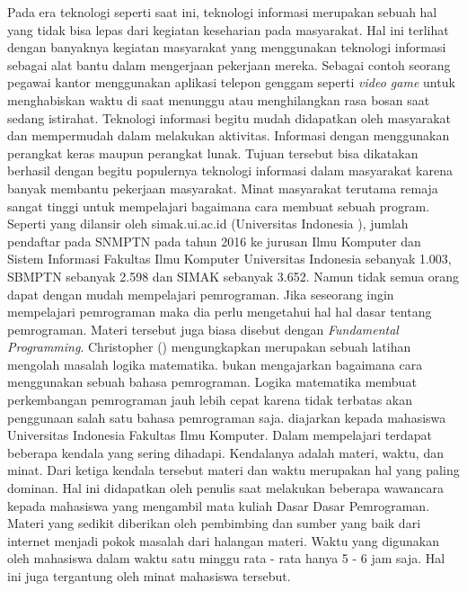 Pada era teknologi seperti saat ini, teknologi informasi merupakan sebuah hal yang tidak bisa lepas dari kegiatan keseharian pada masyarakat. Hal ini terlihat dengan banyaknya kegiatan masyarakat yang menggunakan teknologi informasi sebagai alat bantu dalam mengerjaan pekerjaan mereka. Sebagai contoh seorang pegawai kantor menggunakan aplikasi telepon genggam seperti \textit{video game} untuk menghabiskan waktu di saat menunggu atau menghilangkan rasa bosan saat sedang istirahat.
\linebreak
\linebreak
Teknologi informasi begitu mudah didapatkan oleh masyarakat dan mempermudah dalam melakukan aktivitas. Informasi dengan menggunakan perangkat keras maupun perangkat lunak. Tujuan tersebut bisa dikatakan berhasil dengan begitu populernya teknologi informasi dalam masyarakat karena banyak membantu pekerjaan masyarakat.
\linebreak\linebreak
Minat masyarakat terutama remaja sangat tinggi untuk mempelajari bagaimana cara membuat sebuah program. Seperti yang dilansir oleh simak.ui.ac.id (Universitas Indonesia \citeyear{article.simak}), jumlah pendaftar pada SNMPTN pada tahun 2016 ke jurusan Ilmu Komputer dan Sistem Informasi Fakultas Ilmu Komputer Universitas Indonesia sebanyak 1.003, SBMPTN sebanyak 2.598 dan SIMAK sebanyak 3.652. Namun tidak semua orang dapat dengan mudah mempelajari pemrograman. Jika seseorang ingin mempelajari pemrograman maka dia perlu mengetahui hal hal dasar tentang pemrograman. Materi tersebut juga biasa disebut dengan \textit{Fundamental Programming}.
\linebreak\linebreak
Christopher (\citeyear{paper.christoper}) mengungkapkan \ddp merupakan sebuah latihan mengolah masalah logika matematika. \DDP bukan mengajarkan bagaimana cara menggunakan sebuah bahasa pemrograman. Logika matematika membuat perkembangan pemrograman jauh lebih cepat karena tidak terbatas akan penggunaan salah satu bahasa pemrograman saja.
\linebreak\linebreak
\DDP diajarkan kepada mahasiswa Universitas Indonesia Fakultas Ilmu Komputer. Dalam mempelajari \ddp terdapat beberapa kendala yang sering dihadapi. Kendalanya adalah materi, waktu, dan minat. Dari ketiga kendala tersebut materi dan waktu merupakan hal yang paling dominan. Hal ini didapatkan oleh penulis saat melakukan beberapa wawancara kepada mahasiswa yang mengambil mata kuliah Dasar Dasar Pemrograman. Materi yang sedikit diberikan oleh pembimbing dan sumber yang baik dari internet menjadi pokok masalah dari halangan materi. Waktu yang digunakan oleh mahasiswa dalam waktu satu minggu rata - rata hanya 5 - 6 jam saja. Hal ini juga tergantung oleh minat mahasiswa tersebut.
